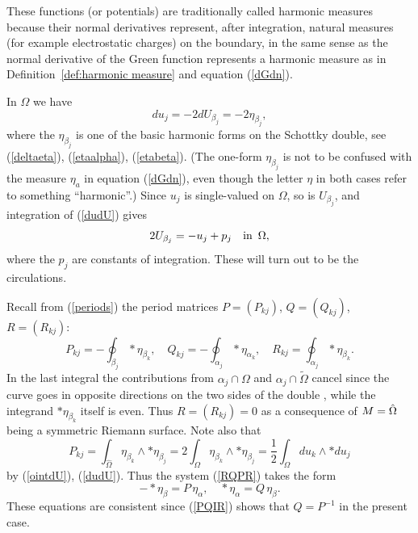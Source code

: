 \documentclass[reqno,12pt]{article}
\theoremstyle{plain}
\theoremstyle{definition}
\numberwithin{equation}{section}
\numberwithin{figure}{section}
\begin{document}
These functions (or potentials) are traditionally called harmonic measures because their normal derivatives represent, 
after integration, natural measures (for example electrostatic charges) on the boundary, in the same sense as the normal 
derivative of the Green function represents a harmonic measure as in Definition~\ref{def:harmonic measure}
and equation (\ref{dGdn}).

In $\Omega$ we have
\begin{equation}\label{dudU}
du_j=-2dU_{\beta_j}=-2\eta_{\beta_j},
\end{equation}
where the $\eta_{\beta_j}$ is one of the basic harmonic forms on the Schottky double, see (\ref{deltaeta}), (\ref{etaalpha}), (\ref{etabeta}). 
(The one-form $\eta_{\beta_j}$ is not to be confused with the measure $\eta_a$ in equation (\ref{dGdn}), even though
the letter $\eta$ in both cases refer to something ``harmonic''.)
Since $u_j$ is single-valued on $\Omega$, so is $U_{\beta_j}$, and integration of (\ref{dudU}) gives
\begin{equation}\label{Uup}
2U_{\beta_j}=-u_j+p_j \quad \text{in \,}\Omega,
\end{equation}
where the $p_j$ are constants of integration. These will turn out to be the circulations.

Recall from (\ref{periods}) the period matrices $P=(P_{kj})$, $Q=(Q_{kj})$, $R=(R_{kj})$: 
$$
P_{kj}=-\oint_{\beta_j} *\eta_{\beta_k}, \quad Q_{kj}=-\oint_{\alpha_j}*\eta_{\alpha_k}, \quad   R_{kj}=\oint_{\alpha_j}*\eta_{\beta_k}.
$$
In the last integral the contributions from $\alpha_j\cap \Omega$ and $\alpha_j\cap \tilde{\Omega}$
cancel since the curve goes in opposite directions on the two sides of the double , while the integrand $*\eta_{\beta_k}$
itself is even. Thus $R=(R_{kj})=0$ as a consequence of $M=\Hat{\Omega}$ being a symmetric Riemann surface. Note also that 
\begin{equation}\label{PUU}
P_{kj}=\int_{\hat{\Omega}} \eta_{\beta_k}\wedge *\eta_{\beta_j}
=2\int_{{\Omega}} \eta_{\beta_k}\wedge *\eta_{\beta_j}
=\frac{1}{2}\int_\Omega du_k\wedge *du_j
\end{equation}
by (\ref{ointdU}), (\ref{dudU}). Thus the system (\ref{RQPR}) takes the form 
\begin{equation}\label{stardUqdU}
-*\eta_\beta=P\,\eta_\alpha, \quad *\eta_\alpha=Q\,\eta_\beta.
\end{equation}
These equations are consistent since (\ref{PQIR}) shows that $Q=P^{-1}$ in the present case.
 
\end{document}
